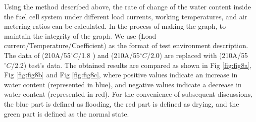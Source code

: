 \par
Using the method described above, the rate of change of the water content inside the fuel cell system under different load currents, working temperatures, and air metering ratios can be calculated. In the process of making the graph, to maintain the integrity of the graph. We use (Load current/Temperature/Coefficient) as the format of test environment description. The data of (210A/55$^{\circ}C$/1.8 ) and (210A/55$^{\circ}C$/2.0) are replaced with (210A/55$^{\circ}C$/2.2) test's data. The obtained results are compared as shown in Fig \ref{fig:fig8a}, Fig \ref{fig:fig8b} and Fig \ref{fig:fig8c}, where positive values indicate an increase in water content (represented in blue), and negative values indicate a decrease in water content (represented in red). For the convenience of subsequent discussions, the blue part is defined as flooding, the red part is defined as drying, and the green part is defined as the normal state.

